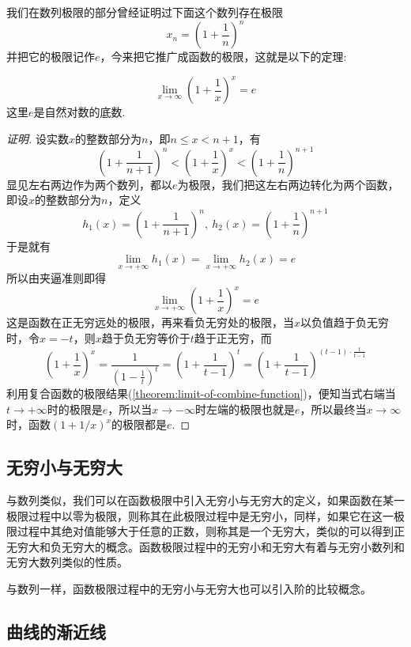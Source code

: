 我们在数列极限的部分曾经证明过下面这个数列存在极限
\[ x_n = \left( 1+\frac{1}{n} \right)^n \]
并把它的极限记作$e$，今来把它推广成函数的极限，这就是以下的定理:
\begin{theorem}
  \[ \lim_{x \to \infty} \left( 1+\frac{1}{x} \right)^x = e \]
  这里$e$是自然对数的底数.
\end{theorem}

\begin{proof}[证明]
  设实数$x$的整数部分为$n$，即$n \leqslant x < n+1$，有
  \[ \left( 1+\frac{1}{n+1} \right)^n < \left( 1+\frac{1}{x} \right)^x < \left( 1+\frac{1}{n} \right)^{n+1} \]
  显见左右两边作为两个数列，都以$e$为极限，我们把这左右两边转化为两个函数，即设$x$的整数部分为$n$，定义
  \[ h_1(x) =  \left( 1+\frac{1}{n+1} \right)^n, \ h_2(x)=\left( 1+\frac{1}{n} \right)^{n+1} \]
  于是就有
  \[ \lim_{x \to +\infty} h_1(x) = \lim_{x \to +\infty} h_2(x) = e \]
  所以由夹逼准则即得
  \[ \lim_{x \to +\infty} \left( 1+\frac{1}{x} \right)^x = e \]
  这是函数在正无穷远处的极限，再来看负无穷处的极限，当$x$以负值趋于负无穷时，令$x=-t$，则$x$趋于负无穷等价于$t$趋于正无穷，而
  \[ \left( 1+\frac{1}{x} \right)^x = \frac{1}{\left( 1-\frac{1}{t} \right)^t} = \left( 1+\frac{1}{t-1} \right)^t = \left( 1+\frac{1}{t-1} \right)^{(t-1) \cdot \frac{t}{t-1}} \]
  利用复合函数的极限结果(\autoref{theorem:limit-of-combine-function})，便知当式右端当$t \to +\infty$时的极限是$e$，所以当$x \to -\infty$时左端的极限也就是$e$，所以最终当$x \to \infty$时，函数$(1+1/x)^x$的极限都是$e$.
\end{proof}


\subsection{无穷小与无穷大}
\label{sec:infinite-small-and-great}

与数列类似，我们可以在函数极限中引入无穷小与无穷大的定义，如果函数在某一极限过程中以零为极限，则称其在此极限过程中是无穷小，同样，如果它在这一极限过程中其绝对值能够大于任意的正数，则称其是一个无穷大，类似的可以得到正无穷大和负无穷大的概念。函数极限过程中的无穷小和无穷大有着与无穷小数列和无穷大数列类似的性质。

与数列一样，函数极限过程中的无穷小与无穷大也可以引入阶的比较概念。

\subsection{曲线的渐近线}
\label{sec:asymptotic-line-of-curve}



